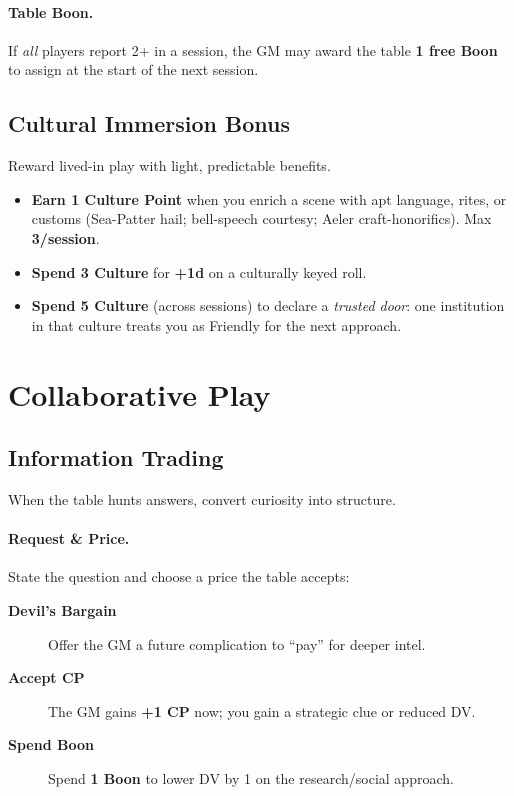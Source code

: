 \begin{multicols}{2}
\paragraph{Table Boon.} If \emph{all} players report 2+ in a session, the GM may award the table \textbf{1 free Boon} to assign at the start of the next session.

\subsection{Cultural Immersion Bonus}

Reward lived-in play with light, predictable benefits.
\begin{itemize}
  \item \textbf{Earn 1 Culture Point} when you enrich a scene with apt language, rites, or customs (Sea-Patter hail; bell-speech courtesy; Aeler craft-honorifics). Max \textbf{3/session}.%
  \item \textbf{Spend 3 Culture} for \textbf{+1d} on a culturally keyed roll.%
  \item \textbf{Spend 5 Culture} (across sessions) to declare a \emph{trusted door}: one institution in that culture treats you as Friendly for the next approach.%
\end{itemize}

\section{Collaborative Play}

\subsection{Information Trading}

When the table hunts answers, convert curiosity into structure.

\paragraph{Request \& Price.}
State the question and choose a price the table accepts:
\begin{description}
  \item[\textbf{Devil’s Bargain}] Offer the GM a future complication to “pay” for deeper intel.%
  \item[\textbf{Accept CP}] The GM gains \textbf{+1 CP} now; you gain a strategic clue or reduced DV.%
  \item[\textbf{Spend Boon}] Spend \textbf{1 Boon} to lower DV by 1 on the research/social approach.%
\end{description}


\end{multicols}
